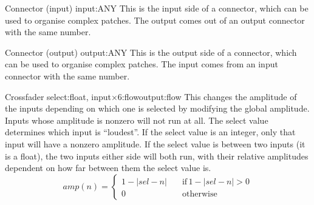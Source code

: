 {Connector (input)}
{input:ANY}{}
This is the input side of a connector, which can be used to
organise complex patches. The output comes out of an output
connector with the same number.


{Connector (output)}
{output:ANY}{}
This is the output side of a connector, which can be used to
organise complex patches. The input comes from an input
connector with the same number.

\clearpage
{}
{Crossfader}
{select:float, input$\times$6:flow}{output:flow}
This changes the amplitude of the inputs depending on which one
is selected by modifying the global amplitude. 
Inputs whose amplitude is nonzero will not run at all.
The select value determines which input is ``loudest''.
If the select value is an integer, only that input
will have a nonzero amplitude. If the select value is between
two inputs (it is a float), the two inputs either side will both
run, with their relative amplitudes dependent on how far between
them the select value is.
\[
amp(n) = \begin{cases}
1-|sel-n| & \quad\mathrm{if}\, 1-|sel-n|>0\\
0 & \quad\mathrm{otherwise}
\end{cases}
\]

